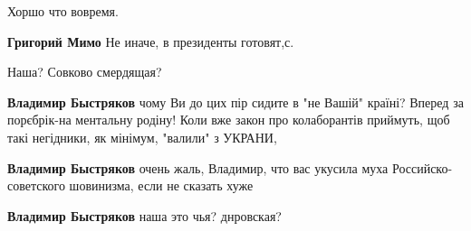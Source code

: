 \begin{itemize}
\begin{itemize}
 
Хоршо что вовремя.

 
\textbf{Григорий Мимо} Не иначе, в президенты готовят,с.

 
Наша? Совково смердящая?

 
\textbf{Владимир Быстряков} чому Ви до цих пір сидите в "не Вашій" країні? Вперед за порєбрік-на ментальну родіну! Коли вже закон про колаборантів приймуть, щоб такі негідники, як мінімум, "валили" з УКРАНИ,

 
\textbf{Владимир Быстряков} очень жаль, Владимир, что вас укусила муха Российско-советского шовинизма, если не сказать хуже

 
\textbf{Владимир Быстряков} наша это чья? днровская?

 

\end{itemize}
\end{itemize}
